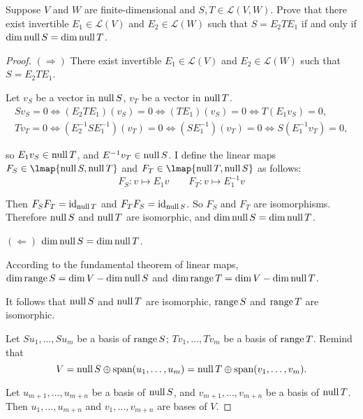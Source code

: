 \begin{exercise}
    Suppose $V$ and $W$ are finite-dimensional and $S, T \in \mathcal{L}(V, W)$. Prove that there exist invertible $E_{1} \in \mathcal{L}(V)$ and $E_{2} \in \mathcal{L}(W)$ such that $S = E_{2} TE_{1}$ if and only if $\dim \text{null}\,{S} = \dim \text{null}\,{T}$.
\end{exercise}

\begin{proof}
    $(\Rightarrow)$ There exist invertible $E_{1} \in \mathcal{L}(V)$ and $E_{2} \in \mathcal{L}(W)$ such that $S = E_{2} TE_{1}$.

    Let $v_{S}$ be a vector in $\text{null}\,{S}$, $v_{T}$ be a vector in $\text{null}\,{T}$.
    \[
        \begin{split}
            Sv_{S} = 0 \Leftrightarrow (E_{2}TE_{1})(v_{S}) = 0 \Leftrightarrow (TE_{1})(v_{S}) = 0 \Leftrightarrow T(E_{1}v_{S}) = 0, \\
            Tv_{T} = 0 \Leftrightarrow (E^{-1}_{2}SE^{-1}_{1})(v_{T}) = 0 \Leftrightarrow (SE^{-1}_{1})(v_{T}) = 0 \Leftrightarrow S(E^{-1}_{1}v_{T}) = 0,
        \end{split}
    \]

    so $E_{1}v_{S}\in \text{null}\,{T}$, and $E^{-1}v_{T}\in \text{null}\,{S}$. I define the linear maps $F_{S}\in\lmap{\kernel{S},\kernel{T}}$ and $F_{T}\in\lmap{\kernel{T},\kernel{S}}$ as follows:
    \[
        F_{S}: v\mapsto E_{1}v\qquad  F_{T}: v\mapsto E^{-1}_{1}v
    \]

    Then $F_{S}F_{T} = \text{id}_{\text{null}\,{T}}$ and $F_{T}F_{S} = \text{id}_{\text{null}\,{S}}$. So $F_{S}$ and $F_{T}$ are isomorphisms. Therefore $\text{null}\,{S}$ and $\text{null}\,{T}$ are isomorphic, and $\dim\text{null}\,{S} = \dim\text{null}\,{T}$.

    $(\Leftarrow)$ $\dim\text{null}\,{S} = \dim\text{null}\,{T}$.

    According to the fundamental theorem of linear maps, $\dim\text{range}\,{S} = \dim V - \dim\text{null}\,{S}$ and $\dim\text{range}\,{T} = \dim V - \dim\text{null}\,{T}$.

    It follows that $\text{null}\,{S}$ and $\text{null}\,{T}$ are isomorphic, $\text{range}\,{S}$ and $\text{range}\,{T}$ are isomorphic.

    Let $Su_{1}, \ldots, Su_{m}$ be a basis of $\text{range}\,{S}$; $Tv_{1}, \ldots, Tv_{m}$ be a basis of $\text{range}\,{T}$. Remind that
    \[
        V = \text{null}\,{S}\oplus\text{span}(u_{1}, \ldots, u_{m}) = \text{null}\,{T}\oplus\text{span}(v_{1}, \ldots, v_{m}).
    \]

    Let $u_{m+1}, \ldots, u_{m+n}$ be a basis of $\text{null}\,{S}$, and $v_{m+1}, \ldots, v_{m+n}$ be a basis of $\text{null}\,{T}$. Then $u_{1}, \ldots, u_{m+n}$ and $v_{1}, \ldots, v_{m+n}$ are bases of $V$.


\end{proof}
